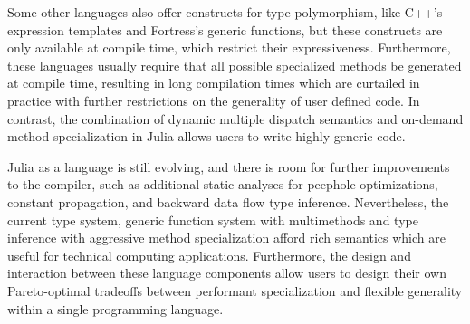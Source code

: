 \documentclass[10pt, preprint]{sigplanconf}
\begin{document}
Some other languages also offer constructs for type polymorphism, like C++'s
expression templates and Fortress's generic functions, but these constructs are
only available at compile time, which restrict their expressiveness.
Furthermore, these languages usually require that all possible specialized
methods be generated at compile time, resulting in long compilation times which
are curtailed in practice with further restrictions on the generality of user
defined code. In contrast, the combination of dynamic multiple dispatch
semantics and on-demand method specialization in Julia allows users to write
highly generic code.

Julia as a language is still evolving, and there is room for further
improvements to the compiler, such as additional static analyses for peephole
optimizations, constant propagation, and backward data flow type inference.
Nevertheless, the current type system, generic function system with
multimethods and type inference with aggressive method specialization afford
rich semantics which are useful for technical computing applications.
Furthermore, the design and interaction between these language components allow
users to design their own Pareto-optimal tradeoffs between performant
specialization and flexible generality within a single programming language.






\end{document}

